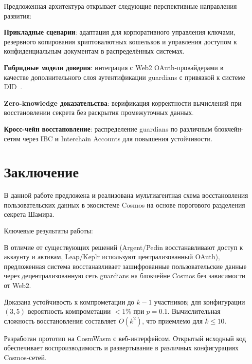 \documentclass[12pt]{a&t}
\begin{document}
Предложенная архитектура открывает следующие перспективные направления развития:

\begin{enumlist}
\item
\textbf{Прикладные сценарии}: адаптация для корпоративного управления ключами, резервного копирования криптовалютных кошельков и управления доступом к конфиденциальным документам в распределённых системах.

\item
\textbf{Гибридные модели доверия}: интеграция с Web2 OAuth-провайдерами в качестве дополнительного слоя аутентификации guardians с привязкой к системе DID~\cite{allen2016}.

\item
\textbf{Zero-knowledge доказательства}: верификация корректности вычислений при восстановлении секрета без раскрытия промежуточных данных.

\item
\textbf{Кросс-чейн восстановление}: распределение guardians по различным блокчейн-сетям через IBC и Interchain Accounts для повышения устойчивости.
\end{enumlist}

\section{Заключение}

В данной работе предложена и реализована мультиагентная схема восстановления пользовательских данных в экосистеме Cosmos на основе порогового разделения секрета Шамира.

Ключевые результаты работы:

\begin{enumlist}
\item
В отличие от существующих решений (Argent/Pedin восстанавливают доступ к аккаунту и активам, Leap/Keplr используют централизованный OAuth), предложенная система восстанавливает зашифрованные пользовательские данные через децентрализованную сеть guardians на блокчейне Cosmos без зависимости от Web2.

\item
Доказана устойчивость к компрометации до $k-1$ участников; для конфигурации $(3,5)$ вероятность компрометации $<1\%$ при $p=0.1$. Вычислительная сложность восстановления составляет $O(k^2)$, что приемлемо для $k \leq 10$.

\item
Разработан прототип на CosmWasm с веб-интерфейсом. Открытый исходный код обеспечивает воспроизводимость и развертывание в различных конфигурациях Cosmos-сетей.
\end{enumlist}
\end{document}
